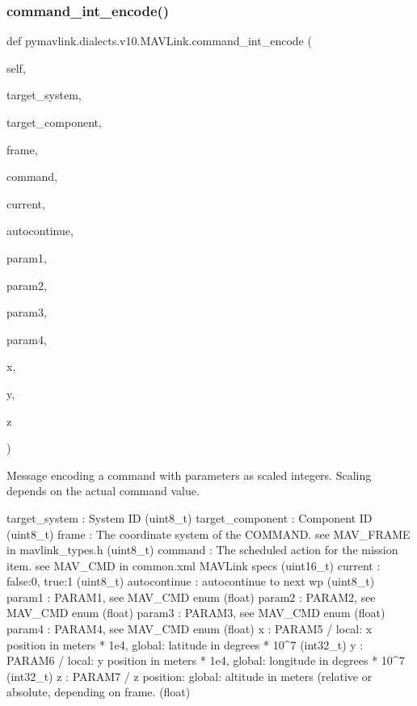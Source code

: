 \begin{DoxyVerb}
\begin{DoxyVerb}
\subsubsection{\texorpdfstring{command\+\_\+int\+\_\+encode()}{command\_int\_encode()}}
{\footnotesize\ttfamily def pymavlink.\+dialects.\+v10.\+M\+A\+V\+Link.\+command\+\_\+int\+\_\+encode (\begin{DoxyParamCaption}\item[{}]{self,  }\item[{}]{target\+\_\+system,  }\item[{}]{target\+\_\+component,  }\item[{}]{frame,  }\item[{}]{command,  }\item[{}]{current,  }\item[{}]{autocontinue,  }\item[{}]{param1,  }\item[{}]{param2,  }\item[{}]{param3,  }\item[{}]{param4,  }\item[{}]{x,  }\item[{}]{y,  }\item[{}]{z }\end{DoxyParamCaption})}

\begin{DoxyVerb}Message encoding a command with parameters as scaled integers. Scaling
depends on the actual command value.

target_system             : System ID (uint8_t)
target_component          : Component ID (uint8_t)
frame                     : The coordinate system of the COMMAND. see MAV_FRAME in mavlink_types.h (uint8_t)
command                   : The scheduled action for the mission item. see MAV_CMD in common.xml MAVLink specs (uint16_t)
current                   : false:0, true:1 (uint8_t)
autocontinue              : autocontinue to next wp (uint8_t)
param1                    : PARAM1, see MAV_CMD enum (float)
param2                    : PARAM2, see MAV_CMD enum (float)
param3                    : PARAM3, see MAV_CMD enum (float)
param4                    : PARAM4, see MAV_CMD enum (float)
x                         : PARAM5 / local: x position in meters * 1e4, global: latitude in degrees * 10^7 (int32_t)
y                         : PARAM6 / local: y position in meters * 1e4, global: longitude in degrees * 10^7 (int32_t)
z                         : PARAM7 / z position: global: altitude in meters (relative or absolute, depending on frame. (float)\end{DoxyVerb}
 \mbox{\label{classpymavlink_1_1dialects_1_1v10_1_1MAVLink_a4ba9ab8087ba87d1f97a2f7b6009e2c0}} 

\end{DoxyVerb}
\end{DoxyVerb}
